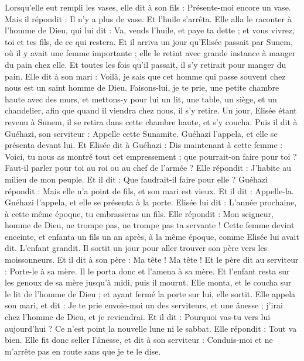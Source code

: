 \begin{multicols}{2}
Lorsqu’elle eut rempli les vases, elle dit à son fils : Présente-moi encore un vase. Mais il répondit : Il n’y a plus de vase. Et l’huile s’arrêta.
Elle alla le raconter à l’homme de Dieu, qui lui dit : Va, vends l’huile, et paye ta dette ; et vous vivrez, toi et tes fils, de ce qui restera.
Et il arriva un jour qu’Elisée passait par Sunem, où il y avait une femme importante ; elle le retint avec grande instance à manger du pain chez elle. Et toutes les fois qu’il passait, il s’y retirait pour manger du pain.
Elle dit à son mari : Voilà, je sais que cet homme qui passe souvent chez nous est un saint homme de Dieu.
Faisons-lui, je te prie, une petite chambre haute avec des murs, et mettons-y pour lui un lit, une table, un siège, et un chandelier, afin que quand il viendra chez nous, il s’y retire.
Un jour, Elisée étant revenu à Sunem, il se retira dans cette chambre haute, et s’y coucha.
Puis il dit à Guéhazi, son serviteur : Appelle cette Sunamite. Guéhazi l’appela, et elle se présenta devant lui.
Et Elisée dit à Guéhazi : Dis maintenant à cette femme : Voici, tu nous as montré tout cet empressement ; que pourrait-on faire pour toi ? Faut-il parler pour toi au roi ou au chef de l’armée ? Elle répondit : J’habite au milieu de mon peuple.
Et il dit : Que faudrait-il faire pour elle ? Guéhazi répondit : Mais elle n’a point de fils, et son mari est vieux.
Et il dit : Appelle-la. Guéhazi l’appela, et elle se présenta à la porte.
Elisée lui dit : L’année prochaine, à cette même époque, tu embrasseras un fils. Elle répondit : Mon seigneur, homme de Dieu, ne trompe pas, ne trompe pas ta servante !
Cette femme devint enceinte, et enfanta un fils un an après, à la même époque, comme Elisée lui avait dit.
L’enfant grandit. Il sortit un jour pour aller trouver son père vers les moissonneurs.
Et il dit à son père : Ma tête ! Ma tête ! Et le père dit au serviteur : Porte-le à sa mère.
Il le porta donc et l’amena à sa mère. Et l’enfant resta sur les genoux de sa mère jusqu’à midi, puis il mourut.
Elle monta, et le coucha sur le lit de l’homme de Dieu ; et ayant fermé la porte sur lui, elle sortit.
Elle appela son mari, et dit : Je te prie envoie-moi un des serviteurs, et une ânesse ; j’irai chez l’homme de Dieu, et je reviendrai.
Et il dit : Pourquoi vas-tu vers lui aujourd’hui ? Ce n’est point la nouvelle lune ni le sabbat. Elle répondit : Tout va bien.
Elle fit donc seller l’ânesse, et dit à son serviteur : Conduis-moi et ne m’arrête pas en route sans que je te le dise.

\end{multicols}

